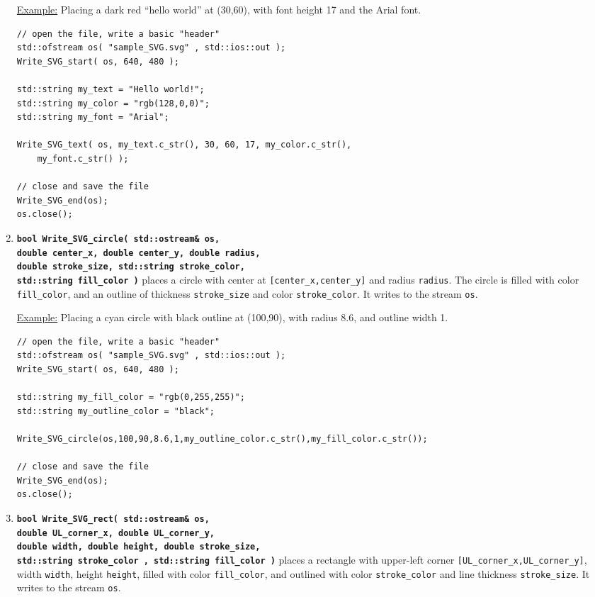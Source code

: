 \documentclass[12pt]{article}
\renewcommand{\v}{\verb}
\newcommand{\smallcode}[1]{\textbf{\texttt{#1}}}
\begin{document}
\begin{enumerate}
\underline{Example:} Placing a dark red ``hello world'' at (30,60), with 
font height 17 and the Arial font. %
\begin{verbatim}
// open the file, write a basic "header"
std::ofstream os( "sample_SVG.svg" , std::ios::out );
Write_SVG_start( os, 640, 480 ); 

std::string my_text = "Hello world!"; 
std::string my_color = "rgb(128,0,0)"; 
std::string my_font = "Arial"; 

Write_SVG_text( os, my_text.c_str(), 30, 60, 17, my_color.c_str(), 
    my_font.c_str() ); 

// close and save the file 
Write_SVG_end(os); 
os.close(); 
\end{verbatim}

\item 
\smallcode{bool Write\_SVG\_circle( std::ostream\& os, \\
\phantom{bool }double center\_x, double center\_y, double radius, \\
\phantom{bool }double stroke\_size, std::string stroke\_color, \\
\phantom{bool }std::string fill\_color )} places a circle with center at 
\v|[center_x,center_y]| and radius \v|radius|. The circle is filled with 
color \v|fill_color|, and an outline of thickness \v|stroke_size| 
and color \v|stroke_color|. It writes to the stream \v|os|. 

\underline{Example:} Placing a cyan circle with black outline at 
(100,90), with radius 8.6, and outline width 1. 
\begin{verbatim}
// open the file, write a basic "header"
std::ofstream os( "sample_SVG.svg" , std::ios::out );
Write_SVG_start( os, 640, 480 ); 

std::string my_fill_color = "rgb(0,255,255)"; 
std::string my_outline_color = "black"; 

Write_SVG_circle(os,100,90,8.6,1,my_outline_color.c_str(),my_fill_color.c_str()); 

// close and save the file 
Write_SVG_end(os); 
os.close(); 
\end{verbatim}

\item 
\smallcode{bool Write\_SVG\_rect( std::ostream\& os, \\
\phantom{bool }double UL\_corner\_x, double UL\_corner\_y, \\
\phantom{bool }double width, double height, double stroke\_size, \\
\phantom{bool }std::string stroke\_color , std::string fill\_color )} 
places a rectangle with upper-left corner 
\v|[UL_corner_x,UL_corner_y]|, width \v|width|, height \v|height|, 
filled with color \v|fill_color|, and outlined with color 
\v|stroke_color| and line thickness \v|stroke_size|.  
It writes to the stream \v|os|. 


\end{enumerate}
\end{document}
